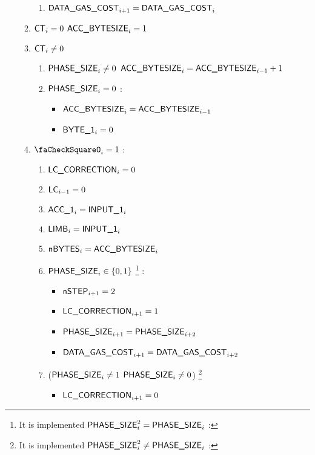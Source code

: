 \begin{enumerate}[resume]
\begin{enumerate}
\begin{enumerate}
                \item $\textsf{DATA\_GAS\_COST}_{i + 1} = \textsf{DATA\_GAS\_COST}_{i}$
            \end{enumerate}
            \item \If $\textsf{CT}_{i}=0$ \Then $\textsf{ACC\_BYTESIZE}_{i}= 1$
            \item \If $\textsf{CT}_{i} \ne 0$ \Then
            \begin{enumerate}
                \item \If $\textsf{PHASE\_SIZE}_{i} \ne 0$ \Then $\textsf{ACC\_BYTESIZE}_{i}=\textsf{ACC\_BYTESIZE}_{i-1}+1$
                \item \If $\textsf{PHASE\_SIZE}_{i}=0$ \Then:
                \begin{itemize}
                    \item $\textsf{ACC\_BYTESIZE}_{i}=\textsf{ACC\_BYTESIZE}_{i-1}$
                    \item $\textsf{BYTE}\textsf{\_1}_{i}=0$
                \end{itemize}
            \end{enumerate}
            \item \If $\done_{i}=1$ \Then:
            \begin{enumerate}
                \item $\textsf{LC\_CORRECTION}_{i}=0$
                \item $\textsf{LC}_{i-1}=0$
                \item $\textsf{ACC}\textsf{\_1}_{i} = \textsf{INPUT\_1}_{i}$
                \item $\textsf{LIMB}_{i} = \textsf{INPUT\_1}_{i}$
                \item $\textsf{nBYTES}_{i}=\textsf{ACC\_BYTESIZE}_{i}$
                \item \If $\textsf{PHASE\_SIZE}_{i} \in \{0, 1\}$ \footnote{It is implemented \If $\textsf{PHASE\_SIZE}_{i}^{2} = \textsf{PHASE\_SIZE}_{i}$ \Then:} \Then:
                \begin{itemize}
                    \item $\textsf{nSTEP}_{i+1}=2$
                    \item  $\textsf{LC\_CORRECTION}_{i+1} = 1$
                    \item $\textsf{PHASE\_SIZE}_{i + 1} = \textsf{PHASE\_SIZE}_{i+2}$
                    \item $\textsf{DATA\_GAS\_COST}_{i + 1} = \textsf{DATA\_GAS\_COST}_{i+2}$
                \end{itemize}
                \item \If ($\textsf{PHASE\_SIZE}_{i} \ne 1$ \et $\textsf{PHASE\_SIZE}_{i} \ne 0$) \footnote{It is implemented \If $\textsf{PHASE\_SIZE}_{i}^{2} \ne \textsf{PHASE\_SIZE}_{i}$ \Then:} \Then 
                \begin{itemize}
                    \item $\textsf{LC\_CORRECTION}_{i+1} = 0$
                \end{itemize}
            \end{enumerate}
        \end{enumerate}        
\end{enumerate}
